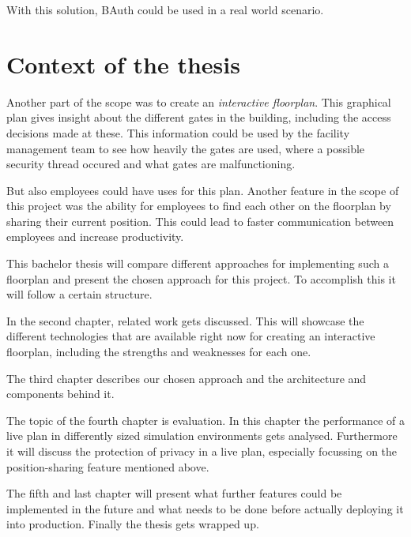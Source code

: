 With this solution, BAuth could be used in a real world scenario.

\section{Context of the thesis}
\label{Context of the thesis}

Another part of the scope was to create an \emph{interactive floorplan}. This graphical plan gives insight about the different gates in the building, including the access decisions made at these. This information could be used by the facility management team to see how heavily the gates are used, where a possible security thread occured and what gates are malfunctioning. 

But also employees could have uses for this plan. Another feature in the scope of this project was the ability for employees to find each other on the floorplan by sharing their current position. This could lead to faster communication between employees and increase productivity.

This bachelor thesis will compare different approaches for implementing such a floorplan and present the chosen approach for this project. To accomplish this it will follow a certain structure. 

In the second chapter, related work gets discussed. This will showcase the different technologies that are available right now for creating an interactive floorplan, including the strengths and weaknesses for each one.

The third chapter describes our chosen approach and the architecture and components behind it.

The topic of the fourth chapter is evaluation. In this chapter the performance of a live plan in differently sized simulation environments gets analysed. Furthermore it will discuss the protection of privacy in a live plan, especially focussing on the position-sharing feature mentioned above.

The fifth and last chapter will present what further features could be implemented in the future and what needs to be done before actually deploying it into production. Finally the thesis gets wrapped up.